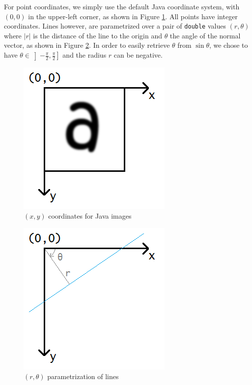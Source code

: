 \documentclass[10pt,a4paper]{article}			%
\begin{document}
For point coordinates, we simply use the default Java coordinate system, with $(0,0)$ in the upper-left corner, as shown in Figure \ref{coordinates}. All points have integer coordinates. Lines however, are parametrized over a pair of \texttt{double} values $(r,\theta)$ where $|r|$ is the distance of the line to the origin and $\theta$ the angle of the normal vector, as shown in Figure \ref{lines_parametrization}. In order to easily retrieve $\theta$ from $\sin\theta$, we chose to have $\theta\in\left]-\frac{\pi}{2},\frac{\pi}{2}\right]$ and the radius $r$ can be negative.
\begin{figure}[h]
\includegraphics[scale=0.7]{img/coordinates.png}
\caption{$(x,y)$ coordinates for Java images}
\label{coordinates}
\end{figure}
\begin{figure}[h]
\includegraphics[scale=0.7]{img/lines.png}
\caption{$(r,\theta)$ parametrization of lines}
\label{lines_parametrization}
\end{figure}
\end{document}
